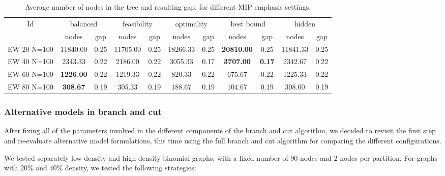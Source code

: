 \begin{sidewaystable}[h]
\label{table:bnc:emph}
\centering

\begin{tabular}{|c|cc|cc|cc|cc|cc|}
\hline
\multicolumn{1}{|c|}{Id} & \multicolumn{2}{|c|}{balanced} & \multicolumn{2}{|c|}{feasibility} & \multicolumn{2}{|c|}{optimality} & \multicolumn{2}{|c|}{best bound} & \multicolumn{2}{|c|}{hidden}
\\
 & nodes & gap & nodes & gap & nodes & gap & nodes & gap & nodes & gap
\\
\hline
EW 20 N=100 & 11840.00 & 0.25 & 11705.00 & 0.25 & 18266.33 & 0.25 & \textbf{20810.00} & 0.25 & 11841.33 & 0.25
\\
EW 40 N=100 & 2343.33 & 0.22 & 2186.00 & 0.22 & 3055.33 & 0.17 & \textbf{3707.00} & \textbf{0.17} & 2342.67 & 0.22
\\
EW 60 N=100 & \textbf{1226.00} & 0.22 & 1219.33 & 0.22 & 820.33 & 0.22 & 675.67 & 0.22 & 1225.33 & 0.22
\\
EW 80 N=100 & \textbf{308.67} & 0.19 & 305.33 & 0.19 & 188.67 & 0.19 & 104.67 & 0.19 & 308.00 & 0.19
\\
\hline 
\end{tabular}

 
\caption{Average number of nodes in the tree and resulting gap, for different MIP emphasis settings.}

\end{sidewaystable}

\clearpage





\subsubsection{Alternative models in branch and cut}

After fixing all of the parameters involved in the different components of the branch and cut algorithm, we decided to revisit the first step and re-evaluate alternative model formulations, this time using the full branch and cut algorithm for comparing the different configurations.

We tested separately low-density and high-density binomial graphs, with a fixed number of $90$ nodes and $2$ nodes per partition. For graphs with $20\%$ and $40\%$ density, we tested the following strategies:

\begin{itemize}
\end{itemize}

